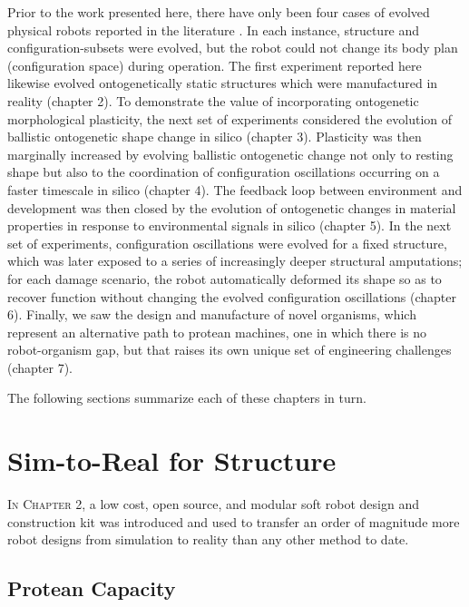 Prior to the work presented here,
there have only been four cases of evolved physical robots reported in the literature
\cite{lipson2000automatic,hiller2012automatic,brodbeck2015morphological,cellucci20171d}.
In each instance, structure and configuration-subsets were evolved, but the robot could not change its body plan (configuration space) during operation.
The first experiment reported here likewise evolved ontogenetically static structures which were manufactured in reality (chapter 2).
To demonstrate 
the value of incorporating ontogenetic morphological plasticity,
the next set of experiments considered
the evolution of ballistic ontogenetic shape change in silico (chapter 3).
Plasticity was then marginally increased by
evolving ballistic ontogenetic change not only to resting shape but also to the coordination of configuration oscillations occurring on a faster timescale in silico (chapter 4).
The feedback loop between environment and development was then closed by
the evolution of ontogenetic changes in material properties in response to environmental signals in silico (chapter 5).
In the next set of experiments,
configuration oscillations were evolved for a fixed structure,
which was later exposed to a series of 
increasingly deeper structural amputations;
for each damage scenario, the robot automatically deformed its shape so as to recover function without changing the evolved configuration oscillations (chapter 6).
Finally, we saw the design and manufacture of novel organisms, which represent an alternative path to protean machines, one in which there is no robot-organism gap, but that raises its own unique set of engineering challenges (chapter 7).

The following sections summarize each of these 
chapters in turn.


\section{Sim-to-Real for Structure}

\textsc{In Chapter 2,}
a low cost, open source, and modular soft robot design and construction kit was introduced and used to
transfer an order of magnitude more robot designs from simulation to reality than any other method to date.

\subsection{Protean Capacity}

